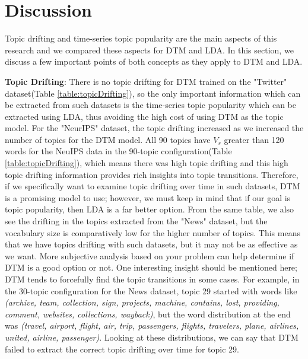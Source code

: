\chapter{Discussion}
 Topic drifting and time-series topic popularity are the main aspects of this research and we compared these aspects for DTM and LDA. In this section, we discuss a few important points of both concepts as they apply to DTM and LDA.

\textbf{Topic Drifting}: There is no topic drifting for DTM trained on the "Twitter" dataset({Table \ref{table:topicDrifting}}), so the only important information which can be extracted from such datasets is the time-series topic popularity which can be extracted using LDA, thus avoiding the high cost of using DTM as the topic model.  For the "NeurIPS" dataset, the topic drifting increased as we increased the number of topics for the DTM model. All 90 topics have  $V_s$ greater than 120 words for the NeuIPS data in the 90-topic configuration(Table \ref{table:topicDrifting}), which means there was high topic drifting and this high topic drifting information provides rich insights into topic transitions. Therefore, if we specifically want to examine topic drifting over time in such datasets, DTM is a promising model to use; however, we must keep in mind that if our goal is topic popularity, then LDA is a far better option. From the same table, we also see the drifting in the topics extracted from the "News" dataset, but the vocabulary size is comparatively low for the higher number of topics. This means that we have topics drifting with such datasets, but it may not be as effective as we want. More subjective analysis based on your problem can help determine if DTM is a good option or not. One interesting insight should be mentioned here; DTM tends to forcefully find the topic transitions in some cases. For example, in the 30-topic configuration for the News dataset, topic 29 started with words like \textit{(archive, team, collection, sign, projects, machine, contains, lost, providing, comment, websites, collections, wayback)}, but the word distribution at the end was \textit{(travel, airport, flight, air, trip, passengers, flights, travelers, plane, airlines, united, airline, passenger)}. Looking at these distributions, we can say that DTM failed to extract the correct topic drifting over time for topic 29.

